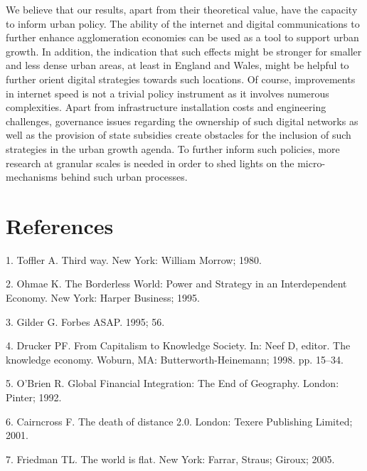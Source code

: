\documentclass[10pt,letterpaper]{article}
\begin{document}
We believe that our results, apart from their theoretical value, have
the capacity to inform urban policy. The ability of the internet and
digital communications to further enhance agglomeration economies can be
used as a tool to support urban growth. In addition, the indication that
such effects might be stronger for smaller and less dense urban areas,
at least in England and Wales, might be helpful to further orient
digital strategies towards such locations. Of course, improvements in
internet speed is not a trivial policy instrument as it involves
numerous complexities. Apart from infrastructure installation costs and
engineering challenges, governance issues regarding the ownership of
such digital networks as well as the provision of state subsidies create
obstacles for the inclusion of such strategies in the urban growth
agenda. To further inform such policies, more research at granular
scales is needed in order to shed lights on the micro-mechanisms behind
such urban processes.

\hypertarget{references}{%
\section*{References}\label{references}}

\hypertarget{refs}{}
\leavevmode\hypertarget{ref-toffler_third_1980}{}%
1. Toffler A. Third way. New York: William Morrow; 1980.

\leavevmode\hypertarget{ref-ohmae_borderless_1995}{}%
2. Ohmae K. The Borderless World: Power and Strategy in an
Interdependent Economy. New York: Harper Business; 1995.

\leavevmode\hypertarget{ref-gilder_notitle_1995}{}%
3. Gilder G. Forbes ASAP. 1995; 56.

\leavevmode\hypertarget{ref-peter_f_drucker_capitalism_1998}{}%
4. Drucker PF. From Capitalism to Knowledge Society. In: Neef D, editor.
The knowledge economy. Woburn, MA: Butterworth-Heinemann; 1998. pp.
15--34.

\leavevmode\hypertarget{ref-obrien_global_1992}{}%
5. O'Brien R. Global Financial Integration: The End of Geography.
London: Pinter; 1992.

\leavevmode\hypertarget{ref-frances_cairncross_death_2001}{}%
6. Cairncross F. The death of distance 2.0. London: Texere Publishing
Limited; 2001.

\leavevmode\hypertarget{ref-friedman_world_2005}{}%
7. Friedman TL. The world is flat. New York: Farrar, Straus; Giroux;
2005.
\end{document}
